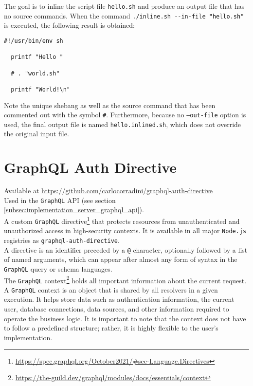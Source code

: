 The goal is to inline the script file \texttt{hello.sh} and produce an output
file that has no source commands. When the command \lstinline[language=shell,
alsoletter={.-}, morekeywords={[2]{inline.sh}}, morekeywords={[3]{--in-file}}]{./inline.sh --in-file "hello.sh"}
is executed, the following result is obtained:

\begin{lstlisting}[language=shell, alsoletter={.}, morekeywords={[2]{.}}, xleftmargin=\parindent, caption=Inlined script \texttt{hello.inlined.sh}]
  #!/usr/bin/env sh

  printf "Hello "

  # . "world.sh"

  printf "World!\n"
\end{lstlisting}

Note the unique shebang as well as the source command that has been commented
out with the symbol \texttt{\#}. Furthermore, because no \texttt{--out-file}
option is used, the final output file is named \texttt{hello.inlined.sh}, which does
not override the original input file.

\section{GraphQL Auth Directive}
\label{sec:corollary_projects_graphql_auth_diretive}

Available at \url{https://github.com/carlocorradini/graphql-auth-directive} \\ %
Used in the \texttt{GraphQL} API (see section \ref{subsec:implementation_server_graphql_api}).
\\ %
A custom \texttt{GraphQL} directive\footnote{\url{https://spec.graphql.org/October2021/\#sec-Language.Directives}}
that protects resources from unauthenticated and unauthorized access in high-security
contexts. It is available in all major \texttt{Node.js} registries as \texttt{graphql-auth-directive}.
\\ %
A directive is an identifier preceded by a \texttt{@} character, optionally
followed by a list of named arguments, which can appear after almost any form of
syntax in the \texttt{GraphQL} query or schema languages. \\ %
The \texttt{GraphQL} context\footnote{\url{https://the-guild.dev/graphql/modules/docs/essentials/context}}
holds all important information about the current request. A \texttt{GraphQL} context
is an object that is shared by all resolvers in a given execution. It helps
store data such as authentication information, the current user, database
connections, data sources, and other information required to operate the
business logic. It is important to note that the context does not have to follow
a predefined structure; rather, it is highly flexible to the user's implementation.

